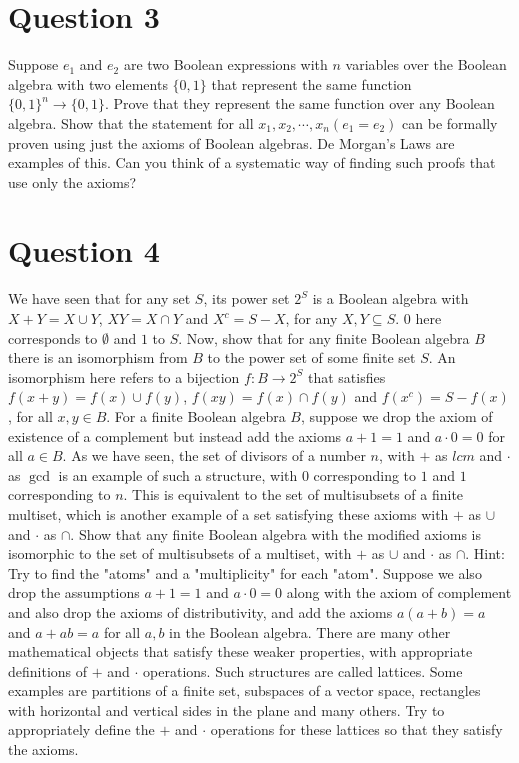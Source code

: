 \documentclass[12pt]{report}
\begin{document}
\section*{Question 3}
Suppose $e_{1}$ and $e_{2}$ are two Boolean expressions with $n$ variables over the Boolean algebra with two elements $\{0, 1\}$ that represent the same function $\{0, 1\}^{n} \rightarrow \{0, 1\}$. Prove that they represent the same function over any Boolean algebra. Show that the statement for all $x_{1}, x_{2}, \cdots, x_{n} (e_{1} = e_{2})$ can be formally proven using just the axioms of Boolean algebras. De Morgan's Laws are examples of this. Can you think of a systematic way of finding such proofs that use only the axioms?
\section*{Question 4}
We have seen that for any set $S$, its power set $2^S$ is a Boolean algebra with $X + Y = X \cup Y$, $XY = X \cap Y$ and $X^{c} = S - X$, for any $X, Y \subseteq S$. $0$ here corresponds to $\emptyset$ and $1$ to $S$. Now, show that for any finite Boolean algebra $B$ there is an isomorphism from $B$ to the power set of some finite set $S$. An isomorphism here refers to a bijection $f : B \rightarrow 2^S$ that satisfies $f(x + y) = f(x) \cup f(y)$, $f(xy) = f(x) \cap f(y)$ and $f(x^{c}) = S - f(x)$, for all $x, y \in B$. For a finite Boolean algebra $B$, suppose we drop the axiom of existence of a complement but instead add the axioms $a + 1 = 1$ and $a \cdot 0 = 0$ for all $a \in B$. As we have seen, the set of divisors of a number $n$, with $+$ as $lcm$ and $\cdot$ as $\gcd$ is an example of such a structure, with $0$ corresponding to $1$ and $1$ corresponding to $n$. This is equivalent to the set of multisubsets of a finite multiset, which is another example of a set satisfying these axioms with $+$ as $\cup$ and $\cdot$ as $\cap$. Show that any finite Boolean algebra with the modified axioms is isomorphic to the set of multisubsets of a multiset, with $+$ as $\cup$ and $\cdot$ as $\cap$. Hint: Try to find the "atoms" and a "multiplicity" for each "atom". Suppose we also drop the assumptions $a + 1 = 1$ and $a \cdot 0 = 0$ along with the axiom of complement and also drop the axioms of distributivity, and add the axioms $a(a + b) = a$ and $a + ab = a$ for all $a, b$ in the Boolean algebra. There
are many other mathematical objects that satisfy these weaker properties, with appropriate definitions of $+$ and $\cdot$ operations. Such structures are called lattices. Some examples are partitions of a finite set, subspaces of a vector space, rectangles with horizontal and vertical sides in the plane and many others. Try to appropriately define the $+$ and $\cdot$ operations for these lattices so that they satisfy the axioms.
\end{document}
